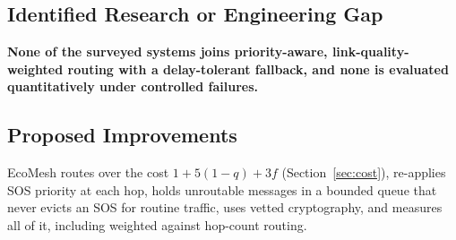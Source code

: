 \subsection{Identified Research or Engineering Gap}
\label{sec:gap}
\textbf{None of the surveyed systems joins priority-aware, link-quality-weighted routing with a delay-tolerant fallback, and none is evaluated quantitatively under controlled failures.}
\subsection{Proposed Improvements}
EcoMesh routes over the cost $1+5(1-q)+3f$ (Section~\ref{sec:cost}), re-applies SOS priority at each hop, holds unroutable messages in a bounded queue that never evicts an SOS for routine traffic, uses vetted cryptography, and measures all of it, including weighted against hop-count routing.
